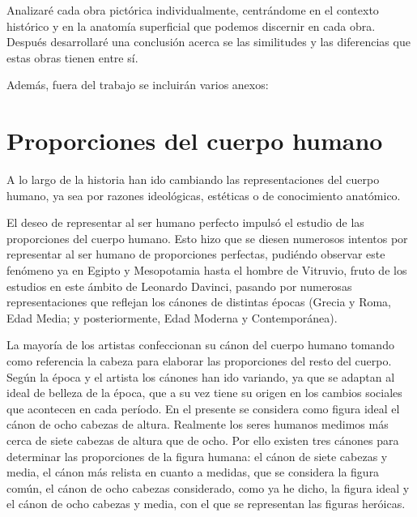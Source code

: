\documentclass[a4paper,12pt]{article} %
\begin{document}
Analizaré cada obra pictórica individualmente, centrándome en el contexto histórico y en la anatomía superficial que podemos discernir en cada obra. Después desarrollaré una conclusión acerca se las similitudes y las diferencias que estas obras tienen entre sí.

Además, fuera del trabajo se incluirán varios anexos:

\newpage

\section{Proporciones del cuerpo humano} %
A lo largo de la historia han ido cambiando las representaciones del cuerpo humano, ya sea por razones ideológicas, estéticas o de conocimiento anatómico.

El deseo de representar al ser humano perfecto impulsó el estudio de las proporciones del cuerpo humano. Esto hizo que se diesen numerosos intentos por representar al ser humano de proporciones perfectas, pudiéndo observar este fenómeno ya en Egipto y Mesopotamia hasta el hombre de Vitruvio, fruto de los estudios en este ámbito de Leonardo Davinci, pasando por numerosas representaciones que reflejan los cánones de distintas épocas (Grecia y Roma, Edad Media; y posteriormente, Edad Moderna y Contemporánea).


La mayoría de los artistas confeccionan su cánon del cuerpo humano tomando como referencia la cabeza para elaborar las proporciones del resto del cuerpo.
Según la época y el artista los cánones han ido variando, ya que se adaptan al ideal de belleza de la época, que a su vez tiene su origen en los cambios sociales que acontecen en cada período. En el presente se considera como figura ideal el cánon de ocho cabezas de altura. Realmente los seres humanos medimos más cerca de siete cabezas de altura que de ocho. Por ello existen tres cánones para determinar las proporciones de la figura humana: el cánon de siete cabezas y media, el cánon más relista en cuanto a medidas, que se considera la figura común, el cánon de ocho cabezas considerado, como ya he dicho, la figura ideal y el cánon de ocho cabezas y media, con el que se representan las figuras heróicas.
\end{document}
